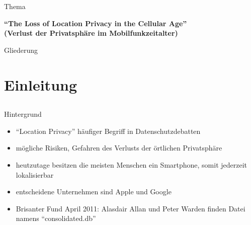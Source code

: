 





\begin{frame}[plain]
 \titlepage
\end{frame}

\begin{frame}{Thema}
\begin{center}
  \huge \textbf{"`The Loss of Location Privacy in the Cellular Age"'\\ \vspace{.5cm} (Verlust der Privatsphäre im Mobilfunkzeitalter)}
\end{center}
\end{frame}

\begin{frame}{Gliederung}
  \tableofcontents[hideallsubsections] %
\end{frame}

\section{Einleitung}
\subsection{}
\begin{frame}{Hintergrund}
\begin{itemize}
  \item "`Location Privacy"' häufiger Begriff in Datenschutzdebatten
  \item mögliche Risiken, Gefahren des Verlusts der örtlichen Privatsphäre
  \item heutzutage besitzen die meisten Menschen ein Smartphone, somit jederzeit lokalisierbar
  \item entscheidene Unternehmen sind Apple und Google
  \item Brisanter Fund April 2011: Alasdair Allan und Peter Warden finden Datei namens "`consolidated.db"'
\end{itemize}
\end{frame}

